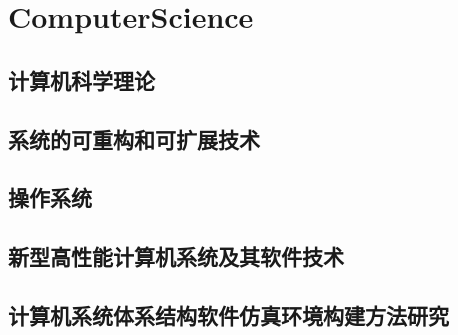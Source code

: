 

\chapter{ComputerScience}

\section{计算机科学理论}
\section{系统的可重构和可扩展技术}
\section{操作系统}
\section{新型高性能计算机系统及其软件技术}
\section{计算机系统体系结构软件仿真环境构建方法研究}








